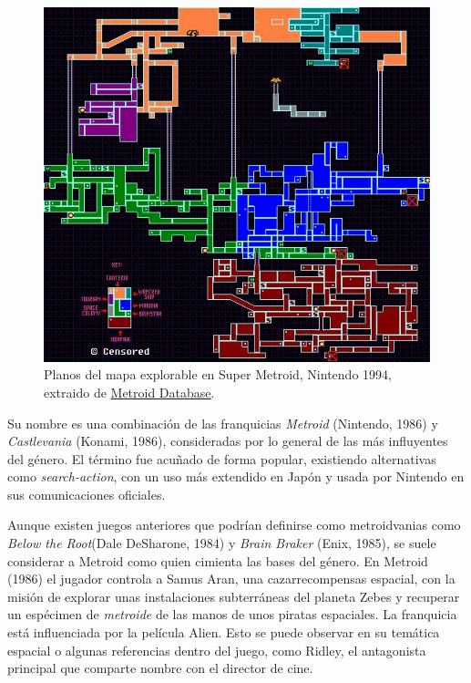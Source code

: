 \begin{figure}[h]
    \centering
    \includegraphics[scale=2.0]{img/smetrmap.jpg}
    \caption[Planos del mapa explorable en Super Metroid]{Planos del mapa explorable en Super Metroid, Nintendo 1994, extraido de \href{https://metroiddatabase.com/maps/}{Metroid Database}.}
    \label{fig:supermetroidmap}
\end{figure}

Su nombre es una combinación de las franquicias \textit{Metroid} (Nintendo, 1986) y \textit{Castlevania} (Konami, 1986), consideradas por lo general de las más influyentes del género. El término fue acuñado de forma popular, existiendo alternativas como \textit{search-action}, con un uso más extendido en Japón y usada por Nintendo en sus comunicaciones oficiales.

Aunque existen juegos anteriores que podrían definirse como metroidvanias como \textit{Below the Root}(Dale DeSharone, 1984) y \textit{Brain Braker} (Enix, 1985), se suele considerar a Metroid como quien cimienta las bases del género. En Metroid (1986) el jugador controla a Samus Aran, una cazarrecompensas espacial, con la misión de explorar unas instalaciones subterráneas del planeta Zebes y recuperar un espécimen de \textit{metroide} de las manos de unos piratas espaciales. La franquicia está influenciada por la película Alien. Esto se puede observar en su temática espacial o algunas referencias dentro del juego, como Ridley, el antagonista principal que comparte nombre con el director de cine.

